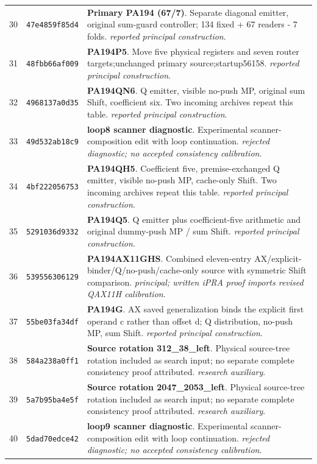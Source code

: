 \begin{longtable}{@{}r p{} p{}@{}}
30 & \texttt{47e4859f85d4} & \textbf{Primary PA194 (67/7)}. Separate diagonal emitter, original sum-guard controller; 134 fixed + 67 readers - 7 folds. \emph{reported principal construction}.\\[3pt]
31 & \texttt{48fbb66af009} & \textbf{PA194P5}. Move five physical registers and seven router targets;unchanged primary source;startup56158. \emph{reported principal construction}.\\[3pt]
32 & \texttt{4968137a0d35} & \textbf{PA194QN6}. Q emitter, visible no-push MP, original sum Shift, coefficient six. Two incoming archives repeat this table. \emph{reported principal construction}.\\[3pt]
33 & \texttt{49d532ab18c9} & \textbf{loop8 scanner diagnostic}. Experimental scanner-composition edit with loop continuation. \emph{rejected diagnostic; no accepted consistency calibration}.\\[3pt]
34 & \texttt{4bf222056753} & \textbf{PA194QH5}. Coefficient five, premise-exchanged Q emitter, visible no-push MP, cache-only Shift. Two incoming archives repeat this table. \emph{reported principal construction}.\\[3pt]
35 & \texttt{5291036d9332} & \textbf{PA194Q5}. Q emitter plus coefficient-five arithmetic and original dummy-push MP / sum Shift. \emph{reported principal construction}.\\[3pt]
36 & \texttt{539556306129} & \textbf{PA194AX11GHS}. Combined eleven-entry AX/explicit-binder/Q/no-push/cache-only source with symmetric Shift comparison. \emph{principal; written iPRA proof imports revised QAX11H calibration}.\\[3pt]
37 & \texttt{55be03fa34df} & \textbf{PA194G}. AX saved generalization binds the explicit first operand c rather than offset d; Q distribution, no-push MP, sum Shift. \emph{reported principal construction}.\\[3pt]
38 & \texttt{584a238a0ff1} & \textbf{Source rotation 312\_38\_left}. Physical source-tree rotation included as search input; no separate complete consistency proof attributed. \emph{research auxiliary}.\\[3pt]
39 & \texttt{5a7b95ba4e5f} & \textbf{Source rotation 2047\_2053\_left}. Physical source-tree rotation included as search input; no separate complete consistency proof attributed. \emph{research auxiliary}.\\[3pt]
40 & \texttt{5dad70edce42} & \textbf{loop9 scanner diagnostic}. Experimental scanner-composition edit with loop continuation. \emph{rejected diagnostic; no accepted consistency calibration}.\\[3pt]

\end{longtable}
